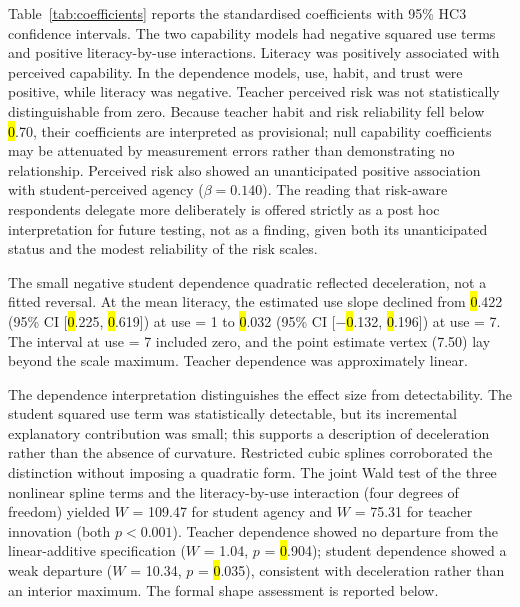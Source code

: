 \documentclass[sustainability,article,accept,moreauthors]{Definitions/mdpi}
\begin{document}
Table~\ref{tab:coefficients} reports the standardised coefficients with 95\% HC3 confidence intervals. The two capability models had negative squared use terms and positive literacy-by-use interactions. Literacy was positively associated with perceived capability. In the dependence models, use, habit, and trust were positive, while literacy was negative. Teacher perceived risk was not statistically distinguishable from zero. Because teacher habit and risk reliability fell below \hl{0}.70, their coefficients are interpreted as provisional; null capability coefficients may be attenuated by measurement errors rather than demonstrating no relationship. Perceived risk also showed an unanticipated positive association with student-perceived agency ($\beta=0.140$). The reading that risk-aware respondents delegate more deliberately is offered strictly as a post hoc interpretation for future testing, not as a finding, given both its unanticipated status and the modest reliability of the risk scales.



The small negative student dependence quadratic reflected deceleration, not a fitted reversal. At the mean literacy, the estimated use slope declined from \hl{0}.422 (95\% CI [\hl{0}.225, \hl{0}.619]) at use = 1 to \hl{0}.032 (95\% CI [$-$\hl{0}.132, \hl{0}.196]) at use = 7. The interval at use = 7 included zero, and the point estimate vertex (7.50) lay beyond the scale maximum. Teacher dependence was approximately linear.

The dependence interpretation distinguishes the effect size from detectability. The student squared use term was statistically detectable, but its incremental explanatory contribution was small; this supports a description of deceleration rather than the absence of curvature. Restricted cubic splines corroborated the distinction without imposing a quadratic form. The joint Wald test of the three nonlinear spline terms and the literacy-by-use interaction (four degrees of freedom) yielded $W$ = 109.47 for student agency and $W$ = 75.31 for teacher innovation (both $p<0.001$). Teacher dependence showed no departure from the linear-additive specification ($W$ = 1.04, $p$ = \hl{0}.904); student dependence showed a weak departure ($W$ = 10.34, $p$ = \hl{0}.035), consistent with deceleration rather than an interior maximum. The formal shape assessment is reported below.
\end{document}
